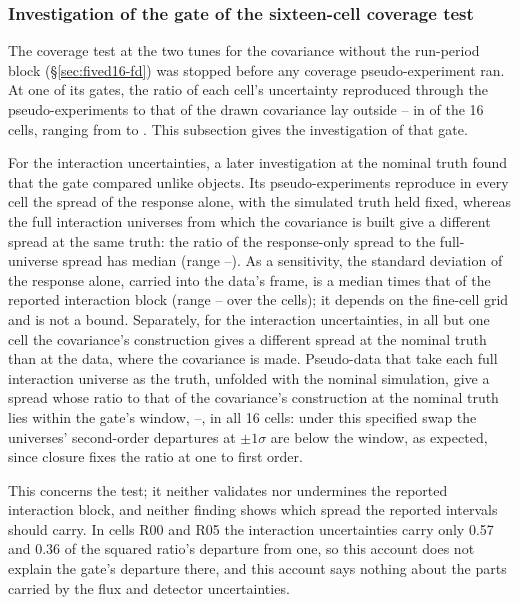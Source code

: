 \subsubsection{Investigation of the gate of the sixteen-cell coverage test}
\label{sec:cov1b-gate}
The coverage test at the two tunes for the covariance without the run-period block (\S\ref{sec:fived16-fd}) was stopped before any coverage pseudo-experiment ran. At one of its gates, the ratio of each cell's uncertainty reproduced through the pseudo-experiments to that of the drawn covariance lay outside -- in  of the 16 cells, ranging from  to . This subsection gives the investigation of that gate.

For the interaction uncertainties, a later investigation at the nominal truth found that the gate compared unlike objects. Its pseudo-experiments reproduce in every cell the spread of the response alone, with the simulated truth held fixed, whereas the full interaction universes from which the covariance is built give a different spread at the same truth: the ratio of the response-only spread to the full-universe spread has median  (range --). As a sensitivity, the standard deviation of the response alone, carried into the data's frame, is a median  times that of the reported interaction block (range -- over the cells); it depends on the fine-cell grid and is not a bound. Separately, for the interaction uncertainties, in all but one cell the covariance's construction gives a different spread at the nominal truth than at the data, where the covariance is made. Pseudo-data that take each full interaction universe as the truth, unfolded with the nominal simulation, give a spread whose ratio to that of the covariance's construction at the nominal truth lies within the gate's window, --, in all 16 cells: under this specified swap the universes' second-order departures at $\pm1\sigma$ are below the window, as expected, since closure fixes the ratio at one to first order.

This concerns the test; it neither validates nor undermines the reported interaction block, and neither finding shows which spread the reported intervals should carry. In cells R00 and R05 the interaction uncertainties carry only 0.57 and 0.36 of the squared ratio's departure from one, so this account does not explain the gate's departure there, and this account says nothing about the parts carried by the flux and detector uncertainties.

